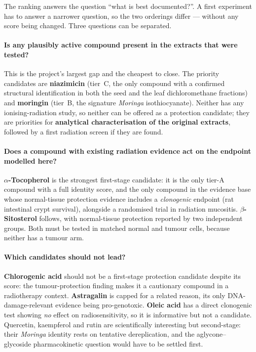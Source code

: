 The ranking answers the question \enquote{what is best documented?}. A first experiment has to
answer a narrower question, so the two orderings differ --- without any score being changed.
Three questions can be separated.

\paragraph{Is any plausibly active compound present in the extracts that were tested?}
This is the project's largest gap and the cheapest to close. The priority candidates are
\textbf{niazimicin} (tier~C, the only compound with a confirmed structural identification in
both the seed and the leaf dichloromethane fractions) and \textbf{moringin} (tier~B, the
signature \textit{Moringa} isothiocyanate). Neither has any ionising-radiation study, so
neither can be offered as a protection candidate; they are priorities for
\textbf{analytical characterisation of the original extracts}, followed by a first radiation
screen if they are found.

\paragraph{Does a compound with existing radiation evidence act on the endpoint modelled
here?} \textbf{$\alpha$-Tocopherol} is the strongest first-stage candidate: it is the only
tier-A compound with a full identity score, and the only compound in the evidence base whose
normal-tissue protection evidence includes a \emph{clonogenic} endpoint (rat intestinal crypt
survival), alongside a randomised trial in radiation mucositis. \textbf{$\beta$-Sitosterol} follows,
with normal-tissue protection reported by two independent groups. Both must be tested in
matched normal and tumour cells, because neither has a tumour arm.

\paragraph{Which candidates should not lead?} \textbf{Chlorogenic acid} should not be a
first-stage protection candidate despite its score: the tumour-protection finding makes it a
cautionary compound in a radiotherapy context. \textbf{Astragalin} is capped for a related
reason, its only DNA-damage-relevant evidence being pro-genotoxic. \textbf{Oleic acid} has a
direct clonogenic test showing \emph{no} effect on radiosensitivity, so it is informative but
not a candidate. Quercetin, kaempferol and rutin are scientifically interesting but
second-stage: their \textit{Moringa} identity rests on tentative dereplication, and the
aglycone--glycoside pharmacokinetic question would have to be settled first.

